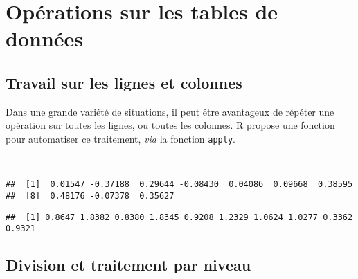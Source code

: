 \chapter{Opérations sur les tables de données\label{c:tables}}

\section{Travail sur les lignes et colonnes}

Dans une grande variété de situations, il peut être avantageux de répéter une opération sur toutes les lignes, ou toutes les colonnes.
R propose une fonction pour automatiser ce traitement, \emph{via} la fonction \texttt{apply}. 

\begin{knitrout}
\color{fgcolor}\begin{kframe}
\begin{flushleft}
\ttfamily\noindent
{}\hlassignement{\usebox{\hlnormalsizeboxlessthan}-}{\ }\hlkeyword{(}\hlkeyword{(}\hlkeyword{)}\hlkeyword{,}{\ }\hlargument{=}{\ }\hlkeyword{)}\hspace*{\fill}\\
\hlstd{}\hlkeyword{(}\hlkeyword{,}{\ }\hlkeyword{,}{\ }\hlkeyword{)}\mbox{}
\normalfont
\end{flushleft}
\begin{verbatim}
##  [1]  0.01547 -0.37188  0.29644 -0.08430  0.04086  0.09668  0.38595
##  [8]  0.48176 -0.07378  0.35627
\end{verbatim}
\begin{flushleft}
\ttfamily\noindent
{}\hlkeyword{(}\hlkeyword{,}{\ }\hlkeyword{,}{\ }\hlkeyword{)}\mbox{}
\normalfont
\end{flushleft}
\begin{verbatim}
##  [1] 0.8647 1.8382 0.8380 1.8345 0.9208 1.2329 1.0624 1.0277 0.3362 0.9321
\end{verbatim}
\end{kframe}
\end{knitrout}


\section{Division et traitement par niveau}

